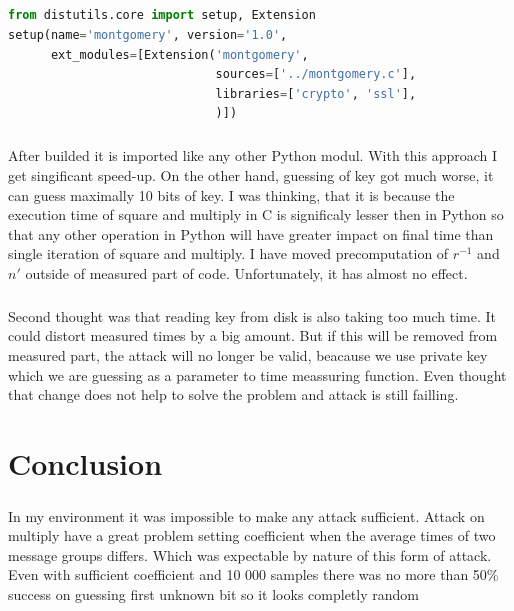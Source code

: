 \documentclass[thesis=B,english]{FITthesis}[2012/10/20]
\begin{document}
{{\paragraph*{}
\begin{lstlisting}[language=Python]
from distutils.core import setup, Extension
setup(name='montgomery', version='1.0',
      ext_modules=[Extension('montgomery',
                             sources=['../montgomery.c'],
                             libraries=['crypto', 'ssl'],
                             )])
\end{lstlisting}

\paragraph*{}
{
After builded it is imported like any other Python modul. With this approach I get singificant speed-up. On the other hand, guessing of key got much worse, it can guess maximally 10 bits of key. I was thinking, that it is because the execution time of square and multiply in C is significaly lesser then in Python so that any other operation in Python will have greater impact on final time than single iteration of square and multiply. I have moved precomputation of \(r^{-1}\) and \(n'\) outside of measured part of code. Unfortunately, it has almost no effect.
}

\paragraph*{}{
Second thought was that reading key from disk is also taking too much time. It could distort measured times by a big amount. But if this will be removed from measured part, the attack will no longer be valid, beacause we use private key which we are guessing as a parameter to time meassuring function. Even thought that change does not help to solve the problem and attack is still failling.
}


\chapter{Conclusion}

\paragraph*{}{
In my environment it was impossible to make any attack sufficient. Attack on multiply have a great problem setting coefficient when the average times of two message groups differs. Which was expectable by nature of this form of attack. Even with sufficient coefficient and 10 000 samples there was no more than 50\% success on guessing first unknown bit so it looks completly random}

}}
\end{document}
